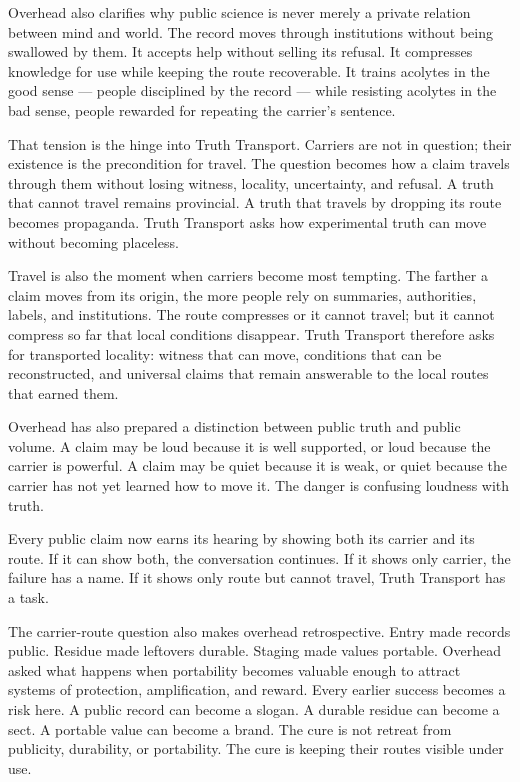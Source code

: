 \begin{movementclose}
Overhead also clarifies why public science is never merely a private
relation between mind and world. The record moves through institutions
without being swallowed by them. It accepts help without selling its
refusal. It compresses knowledge for use while keeping the route
recoverable. It trains acolytes in the good sense --- people disciplined by
the record --- while resisting acolytes in the bad sense, people rewarded
for repeating the carrier's sentence.

That tension is the hinge into Truth Transport. Carriers are not in
question; their existence is the precondition for travel. The question
becomes how a claim travels through them without losing witness, locality,
uncertainty, and refusal. A truth that cannot travel remains provincial. A
truth that travels by dropping its route becomes propaganda. Truth Transport
asks how experimental truth can move without becoming placeless.

Travel is also the moment when carriers become most tempting. The farther a
claim moves from its origin, the more people rely on summaries, authorities,
labels, and institutions. The route compresses or it cannot travel; but it
cannot compress so far that local conditions disappear. Truth Transport
therefore asks for transported locality: witness that can move, conditions
that can be reconstructed, and universal claims that remain answerable to
the local routes that earned them.

Overhead has also prepared a distinction between public truth and public
volume. A claim may be loud because it is well supported, or loud because the
carrier is powerful. A claim may be quiet because it is weak, or quiet because
the carrier has not yet learned how to move it. The danger is confusing
loudness with truth.

Every public claim now earns its hearing by showing both its carrier and its
route. If it can show both, the conversation continues. If it shows only
carrier, the failure has a name. If it shows only route but cannot travel,
Truth Transport has a task.

The carrier-route question also makes overhead retrospective. Entry made
records public. Residue made leftovers durable. Staging made values
portable. Overhead asked what happens when portability becomes valuable
enough to attract systems of protection, amplification, and reward. Every
earlier success becomes a risk here. A public record can become a slogan. A
durable residue can become a sect. A portable value can become a brand. The
cure is not retreat from publicity, durability, or portability. The cure is
keeping their routes visible under use.


\end{movementclose}
